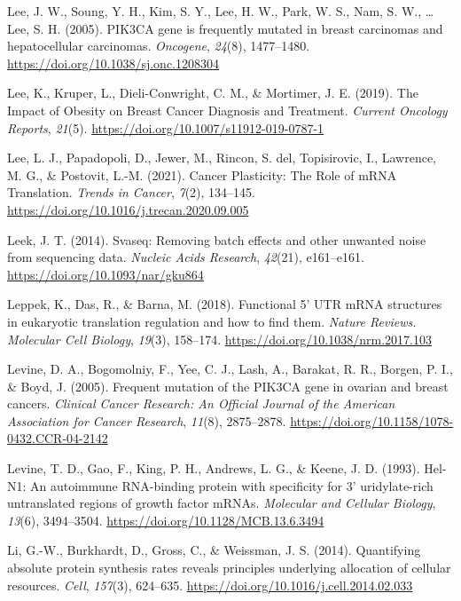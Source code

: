 \documentclass[12pt,openany]{book}
\begin{document}
\hypertarget{ref-Lee2005}{}
Lee, J. W., Soung, Y. H., Kim, S. Y., Lee, H. W., Park, W. S., Nam, S.
W., \ldots{} Lee, S. H. (2005). PIK3CA gene is frequently mutated in
breast carcinomas and hepatocellular carcinomas. \emph{Oncogene},
\emph{24}(8), 1477--1480. \url{https://doi.org/10.1038/sj.onc.1208304}

\hypertarget{ref-Lee2019}{}
Lee, K., Kruper, L., Dieli-Conwright, C. M., \& Mortimer, J. E. (2019).
The Impact of Obesity on Breast Cancer Diagnosis and Treatment.
\emph{Current Oncology Reports}, \emph{21}(5).
\url{https://doi.org/10.1007/s11912-019-0787-1}

\hypertarget{ref-Lee2021}{}
Lee, L. J., Papadopoli, D., Jewer, M., Rincon, S. del, Topisirovic, I.,
Lawrence, M. G., \& Postovit, L.-M. (2021). Cancer Plasticity: The Role
of mRNA Translation. \emph{Trends in Cancer}, \emph{7}(2), 134--145.
\url{https://doi.org/10.1016/j.trecan.2020.09.005}

\hypertarget{ref-Leek2014}{}
Leek, J. T. (2014). Svaseq: Removing batch effects and other unwanted
noise from sequencing data. \emph{Nucleic Acids Research},
\emph{42}(21), e161--e161. \url{https://doi.org/10.1093/nar/gku864}

\hypertarget{ref-Leppek2018}{}
Leppek, K., Das, R., \& Barna, M. (2018). Functional 5' UTR mRNA
structures in eukaryotic translation regulation and how to find them.
\emph{Nature Reviews. Molecular Cell Biology}, \emph{19}(3), 158--174.
\url{https://doi.org/10.1038/nrm.2017.103}

\hypertarget{ref-Levine2005}{}
Levine, D. A., Bogomolniy, F., Yee, C. J., Lash, A., Barakat, R. R.,
Borgen, P. I., \& Boyd, J. (2005). Frequent mutation of the PIK3CA gene
in ovarian and breast cancers. \emph{Clinical Cancer Research: An
Official Journal of the American Association for Cancer Research},
\emph{11}(8), 2875--2878.
\url{https://doi.org/10.1158/1078-0432.CCR-04-2142}

\hypertarget{ref-Levine1993}{}
Levine, T. D., Gao, F., King, P. H., Andrews, L. G., \& Keene, J. D.
(1993). Hel-N1: An autoimmune RNA-binding protein with specificity for
3' uridylate-rich untranslated regions of growth factor mRNAs.
\emph{Molecular and Cellular Biology}, \emph{13}(6), 3494--3504.
\url{https://doi.org/10.1128/MCB.13.6.3494}

\hypertarget{ref-Li2014}{}
Li, G.-W., Burkhardt, D., Gross, C., \& Weissman, J. S. (2014).
Quantifying absolute protein synthesis rates reveals principles
underlying allocation of cellular resources. \emph{Cell}, \emph{157}(3),
624--635. \url{https://doi.org/10.1016/j.cell.2014.02.033}
\end{document}

